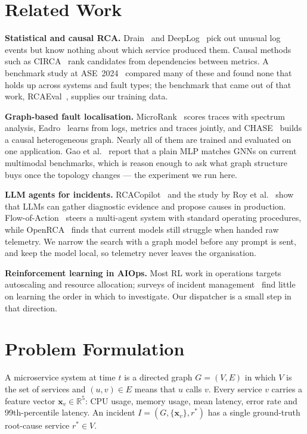 \documentclass[conference,a4paper]{IEEEtran}
\begin{document}
\section{Related Work}
\textbf{Statistical and causal RCA.} Drain~\cite{he2017drain} and DeepLog~\cite{du2017deeplog} pick out unusual log events but know nothing about which service produced them. Causal methods such as CIRCA~\cite{li2022circa} rank candidates from dependencies between metrics. A benchmark study at ASE~2024~\cite{pham2024howfar} compared many of these and found none that holds up across systems and fault types; the benchmark that came out of that work, RCAEval~\cite{pham2025rcaeval}, supplies our training data.

\textbf{Graph-based fault localisation.} MicroRank~\cite{yu2021microrank} scores traces with spectrum analysis, Eadro~\cite{lee2023eadro} learns from logs, metrics and traces jointly, and CHASE~\cite{zhao2024chase} builds a causal heterogeneous graph. Nearly all of them are trained and evaluated on one application. Gao et al.~\cite{gao2025diagmlp} report that a plain MLP matches GNNs on current multimodal benchmarks, which is reason enough to ask what graph structure buys once the topology changes --- the experiment we run here.

\textbf{LLM agents for incidents.} RCACopilot~\cite{chen2024rcacopilot} and the study by Roy et al.~\cite{roy2024llmagents} show that LLMs can gather diagnostic evidence and propose causes in production. Flow-of-Action~\cite{pei2025flowofaction} steers a multi-agent system with standard operating procedures, while OpenRCA~\cite{xu2025openrca} finds that current models still struggle when handed raw telemetry. We narrow the search with a graph model before any prompt is sent, and keep the model local, so telemetry never leaves the organisation.

\textbf{Reinforcement learning in AIOps.} Most RL work in operations targets autoscaling and resource allocation; surveys of incident management~\cite{remil2024aiops} find little on learning the order in which to investigate. Our dispatcher is a small step in that direction.

\section{Problem Formulation}
A microservice system at time $t$ is a directed graph $G=(V,E)$ in which $V$ is the set of services and $(u,v)\in E$ means that $u$ calls $v$. Every service $v$ carries a feature vector $\mathbf{x}_v\in\mathbb{R}^5$: CPU usage, memory usage, mean latency, error rate and 99th-percentile latency. An incident $I=(G,\{\mathbf{x}_v\},r^*)$ has a single ground-truth root-cause service $r^*\in V$.
\end{document}
